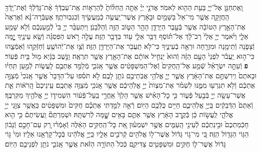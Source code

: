 \documentclass[twoside, openany, parskip=half, 11pt]{book}
\begin{document}
\begin{footnotesize}
\begin{multicols}{2}
\\
וָֽאֶתְחַנַּ֖ן אֶל־יְיָ֑ בָּעֵ֥ת הַהִ֖וא לֵאמֹֽר׃ אֲדֹנָ֣י יְיָ֗ אַתָּ֤ה הַֽחִלּ֨וֹתָ֙ לְֿהַרְא֣וֹת אֶֽת־עַבְדְּֿךָ֔ אֶ֨ת־גָּדְֿלְֿךָ֔ וְֿאֶת־יָֽדְֿךָ֖ הַֽחֲזָקָ֑ה אֲשֶׁ֤ר מִי־אֵל֙ בַּשָּׁמַ֣יִם וּבָאָ֔רֶץ אֲשֶׁר־יַֽעֲשֶׂ֥ה כְֿמַֽעֲשֶׂ֖יךָ וְֿכִגְבֽוּרֹתֶֽךָ׃ אֶעְבְּֿרָה־נָּ֗א וְֿאֶרְאֶה֙ אֶת־הָאָ֣רֶץ הַטּוֹבָ֔ה אֲשֶׁ֖ר בְּֿעֵ֣בֶר הַיַּרְדֵּ֑ן הָהָ֥ר הַטּ֛וֹב הַזֶּ֖ה וְֿהַלְּֿבָנֹֽן׃  וַיִּתְעַבֵּ֨ר יְיָ֥ בִּי֙ לְֿמַ֣עַנְכֶ֔ם וְֿלֹ֥א שָׁמַ֖ע אֵלָ֑י וַיֹּ֨אמֶר יְיָ֤ אֵלַי֙ רַב־לָ֔ךְ אַל־תּ֗וֹסֶף דַּבֵּ֥ר אֵלַ֛י ע֖וֹד בַּדָּבָ֥ר הַזֶּֽה׃ עֲלֵ֣ה רֹ֣אשׁ הַפִּסְגָּ֗ה וְֿשָׂ֥א עֵינֶ֛יךָ יׇׇׇָ֧מָּה וְֿצָפֹ֛נָה וְֿתֵימָ֥נָה וּמִזְרָ֖חָה וּרְאֵ֣ה בְֿעֵינֶ֑יךָ כִּי־לֹ֥א תַֽעֲבֹ֖ר אֶת־הַיַּרְדֵּ֥ן הַזֶּֽה׃ וְֿצַ֥ו אֶת־יְֿהוֹשֻׁ֖עַ וְֿחַזְּֿקֵ֣הוּ וְֿאַמְּֿצֵ֑הוּ כִּי־ה֣וּא יַֽעֲבֹ֗ר לִפְנֵי֙ הָעָ֣ם הַזֶּ֔ה וְֿהוּא֙ יַנְחִ֣יל אוֹתָ֔ם אֶת־הָאָ֖רֶץ אֲשֶׁ֥ר תִּרְאֶֽה׃ וַנֵּ֣שֶׁב בַּגָּ֔יְא מ֖וּל בֵּ֥ית פְּֿעֽוֹר׃ \textbf{פ}
וְֿעַתָּ֣ה יִשְׂרָאֵ֗ל שְֿׁמַ֤ע אֶל־הַֽחֻקִּים֙ וְֿאֶל־הַמִּשְׁפָּטִ֔ים אֲשֶׁ֧ר אָֽנֹכִ֛י מְֿלַמֵּ֥ד אֶתְכֶ֖ם לַֽעֲשׂ֑וֹת לְֿמַ֣עַן תִּֽחְי֗וּ וּבָאתֶם֙ וִֽירִשְׁתֶּ֣ם אֶת־הָאָ֔רֶץ אֲשֶׁ֧ר יְיָ֛ אֱלֹהֵ֥י אֲבֹֽתֵיכֶ֖ם נֹתֵ֥ן לָכֶֽם׃ לֹ֣א תֹסִ֗פוּ עַל־הַדָּבָר֙ אֲשֶׁ֤ר אָֽנֹכִי֙ מְֿצַוֶּ֣ה אֶתְכֶ֔ם וְֿלֹ֥א תִגְרְע֖וּ מִמֶּ֑נּוּ לִשְׁמֹ֗ר אֶת־מִצְוֹת֙ יְיָ֣ אֱלֹֽהֵיכֶ֔ם אֲשֶׁ֥ר אָֽנֹכִ֖י מְֿצַוֶּ֥ה אֶתְכֶֽם׃ עֵֽינֵיכֶם֙ הָֽרֹא֔וֹת אֵ֛ת אֲשֶׁר־עָשָׂ֥ה יְיָ֖ בְּֿבַ֣עַל פְּֿע֑וֹר כִּ֣י כׇל־הָאִ֗ישׁ אֲשֶׁ֤ר הָלַךְ֙ אַֽחֲרֵ֣י בַֽעַל־פְּֿע֔וֹר הִשְׁמִיד֛וֹ יְיָ֥ אֱלֹהֶ֖יךָ מִקִּרְבֶּֽךָ׃ וְֿאַתֶּם֙ הַדְּֿבֵקִ֔ים בַּֽיְיָ֖ אֱלֹֽהֵיכֶ֑ם חַיִּ֥ים כֻּלְּֿכֶ֖ם הַיּֽוֹם׃  רְֿאֵ֣ה לִמַּ֣דְתִּי אֶתְכֶ֗ם חֻקִּים֙ וּמִשְׁפָּטִ֔ים כַּֽאֲשֶׁ֥ר צִוַּ֖נִי יְיָ֣ אֱלֹהָ֑י לַֽעֲשׂ֣וֹת כֵּ֔ן בְּֿקֶ֣רֶב הָאָ֔רֶץ אֲשֶׁ֥ר אַתֶּ֛ם בָּאִ֥ים שׇׇׇָׁ֖מָּה לְֿרִשְׁתָּֽהּ׃ וּשְׁמַרְתֶּם֘ וַֽעֲשִׂיתֶם֒ כִּ֣י הִ֤וא חָכְֿמַתְכֶם֙ וּבִ֣ינַתְכֶ֔ם לְֿעֵינֵ֖י הָֽעַמִּ֑ים אֲשֶׁ֣ר יִשְׁמְע֗וּן אֵ֚ת כׇּל־הַֽחֻקִּ֣ים הָאֵ֔לֶּה וְֿאָמְֿר֗וּ רַ֚ק עַם־חָכָ֣ם וְֿנָב֔וֹן הַגּ֥וֹי הַגָּד֖וֹל הַזֶּֽה׃ כִּ֚י מִי־ג֣וֹי גָּד֔וֹל אֲשֶׁר־ל֥וֹ אֱלֹהִ֖ים קְֿרֹבִ֣ים אֵלָ֑יו כַּֽיְיָ֣ אֱלֹהֵ֔ינוּ בְּֿכׇל־קָרְֿאֵ֖נוּ אֵלָֽיו׃ וּמִי֙ גּ֣וֹי גָּד֔וֹל אֲשֶׁר־ל֛וֹ חֻקִּ֥ים וּמִשְׁפָּטִ֖ים צַדִּיקִ֑ם כְּֿכֹל֙ הַתּוֹרָ֣ה הַזֹּ֔את אֲשֶׁ֧ר אָֽנֹכִ֛י נֹתֵ֥ן לִפְנֵיכֶ֖ם הַיּֽוֹם׃


\end{multicols}
\end{footnotesize}
\end{document}
